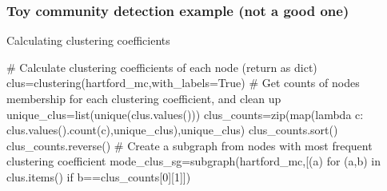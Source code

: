\documentclass[xcolor=dvipsnames, 9pt]{beamer}
\begin{document}
\begin{frame}[fragile]
    \frametitle{Toy community detection example (not a good one)}
    \begin{block}{Calculating clustering coefficients}
        \begin{code}
\scriptsize{\alert<2>{# Calculate clustering coefficients of each node (return as dict)
clus=clustering(hartford_mc,with_labels=True)}
\alert<3>{# Get counts of nodes membership for each clustering coefficient, and clean up
unique_clus=list(unique(clus.values()))
clus_counts=zip(map(lambda c: clus.values().count(c),unique_clus),unique_clus)
clus_counts.sort()
clus_counts.reverse()}
\alert<4>{# Create a subgraph from nodes with most frequent clustering coefficient
mode_clus_sg=subgraph(hartford_mc,[(a) for (a,b) in clus.items() if b==clus_counts[0][1]])}}         
        \end{code}
    \end{block}
    \begin{columns}
        \begin{itemize}
        \end{itemize}
            \begin{center}
            \end{center}
    \end{columns}
    \begin{center}
    \end{center}
\end{frame}
\end{document}
